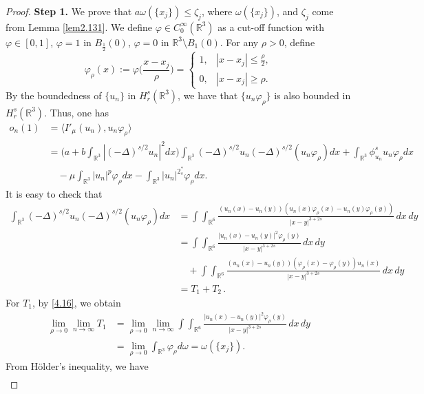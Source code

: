 \documentclass[11pt]{article}
\numberwithin{equation}{section}
\begin{document}
\begin{proof}
\noindent\textbf{Step 1.} We prove that $a\omega(\{x_j\})\leq\zeta_j$,
where $\omega(\{x_j\})$, and $\zeta_j$ come from Lemma \ref{lem2.131}.
We define $\varphi \in C^\infty_0(\mathbb{R}^3)$ as a cut-off function with
$\varphi \in [0,1]$, $\varphi=1$ in $B_{\frac{1}{2}}(0)$, $\varphi=0$ in
$\mathbb{R}^3\setminus B_1(0)$. For any $\rho>0$, define
\[
\varphi_\rho(x):=\varphi\Big(\frac{x-x_j}{\rho}\Big)
=\begin{cases}
1, & |x-x_j|\leq \frac{\rho}{2}, \\
0, & |x-x_j|\geq {\rho}.
\end{cases}
\]
By the boundedness of $\{u_n\}$ in $H^s_{r}(\mathbb{R}^3)$, we have that
$\{u_n\varphi_\rho\}$ is also bounded in $H^s_{r}(\mathbb{R}^3)$. Thus, one has
\begin{equation}\label{4.17}
\begin{split}
o_n(1)
&= \langle I'_\mu(u_n), u_n\varphi_\rho \rangle\\
&= \Big(a+b\int_{\mathbb{R}^3}|(-\Delta)^{s/2}u_n|^2dx\Big)
 \int_{\mathbb{R}^3}(-\Delta)^{s/2}u_n
 (-\Delta)^{s/2}(u_n\varphi_\rho)dx+\int_{\mathbb{R}^3}\phi^s_{u_n}
 u_n \varphi_\rho dx\\
&\quad-\mu \int_{\mathbb{R}^3}|u_n|^p\varphi_\rho dx
 -\int_{\mathbb{R}^3}|u_n|^{2^*_s}\varphi_\rho dx.
\end{split}
\end{equation}
It is easy to check that
\begin{align*}
\int_{\mathbb{R}^3}(-\Delta)^{s/2}u_n
(-\Delta)^{s/2}(u_n\varphi_\rho)dx 
&= \int\int_{\mathbb{R}^6}\frac{(u_n(x)-u_n(y))(u_n(x)\varphi_\rho(x)-u_n(y)\varphi_\rho(y))}{|x-y|^{3+2s}}\,dx\,dy\\
&= \int\int_{\mathbb{R}^6}\frac{|u_n(x)-u_n(y)|^2\varphi_\rho(y)}{|x-y|^{3+2s}}\,dx\,dy\\
&\quad+\int\int_{\mathbb{R}^6}\frac{(u_n(x)-u_n(y))(\varphi_\rho(x)
 -\varphi_\rho(y))u_n(x)}{|x-y|^{3+2s}}\,dx\,dy \\
&=T_1+T_2\,.
\end{align*}
For $T_1$, by \eqref{4.16}, we obtain
\[
\begin{split}
\lim_{\rho\to 0}\lim_{n\to\infty}T_1
&= \lim_{\rho\to 0}\lim_{n\to\infty}\int\int_{\mathbb{R}^6}\frac{|u_n(x)-u_n(y)|^2\varphi_\rho(y)}{|x-y|^{3+2s}}\,dx\,dy\\
&= \lim_{\rho\to 0}\int_{\mathbb{R}^3}\varphi_\rho d\omega=\omega(\{x_j\}).
\end{split}
\]
From H\"older's inequality, we have
\[
\begin{split}

\end{split}\]
\end{proof}
\end{document}
